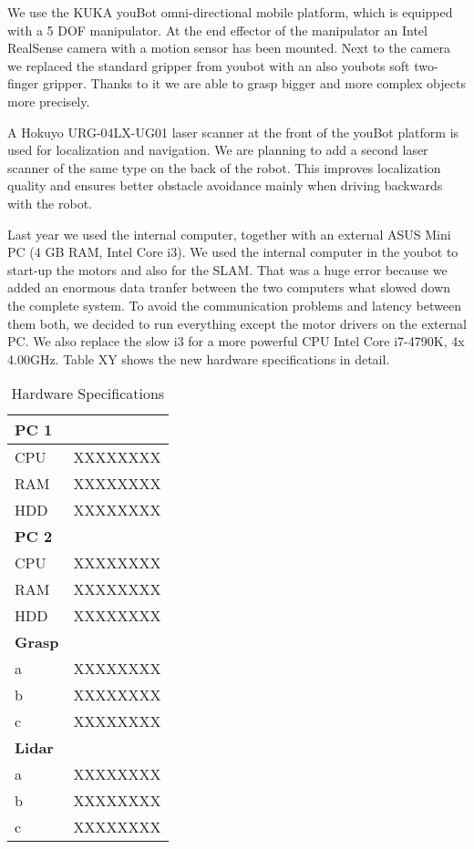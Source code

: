 We use the KUKA youBot omni-directional mobile platform, which is equipped with a 5 DOF manipulator. At the end effector of the manipulator an Intel RealSense camera with a motion sensor has been mounted. Next to the camera we replaced the standard gripper from youbot with an also youbots soft two-finger gripper. Thanks to it we are able to grasp bigger and more complex objects more precisely.

A Hokuyo URG-04LX-UG01 laser scanner at the front of the youBot platform is used for localization and navigation. We are planning to add a second laser scanner of the same type on the back of the robot. This improves localization quality and ensures better obstacle avoidance mainly when driving backwards with the robot.

Last year we used the internal computer, together with an external ASUS Mini PC (4 GB RAM, Intel Core i3). We used the internal computer in the youbot to start-up the motors and also for the SLAM. That was a huge error because we added an enormous data tranfer between the two computers what slowed down the complete system. To avoid the communication problems and latency between them both, we decided to run everything except the motor drivers on the external PC. We also replace the slow i3 for a more powerful CPU Intel Core i7-4790K, 4x 4.00GHz. Table XY  shows the new hardware specifications in detail.

\begin{table}[h]
	\caption{Hardware Specifications}
	\centering
	\begin{tabular}{ | p{3cm} | p{3cm} | }
		\hline
		\bfseries{PC 1} &  \\
		\hline
		CPU & XXXXXXXX \\
		RAM & XXXXXXXX \\
		HDD & XXXXXXXX \\
		\hline \hline
		\bfseries{PC 2} &  \\
		\hline
		CPU & XXXXXXXX \\
		RAM & XXXXXXXX \\
		HDD & XXXXXXXX \\
		\hline \hline
		\bfseries{Grasp} &  \\
		\hline
		a & XXXXXXXX \\
		b & XXXXXXXX \\
		c & XXXXXXXX \\
		\hline \hline
		\bfseries{Lidar} &  \\
		\hline
		a & XXXXXXXX \\
		b & XXXXXXXX \\
		c & XXXXXXXX \\
		\hline
	\end{tabular}
	\label{tab:hw}
\end{table}

